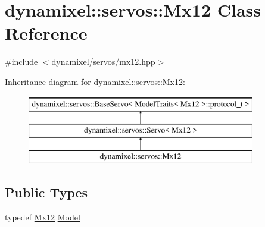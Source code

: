 \hypertarget{classdynamixel_1_1servos_1_1_mx12}{}\section{dynamixel\+:\+:servos\+:\+:Mx12 Class Reference}
\label{classdynamixel_1_1servos_1_1_mx12}


{\ttfamily \#include $<$dynamixel/servos/mx12.\+hpp$>$}

Inheritance diagram for dynamixel\+:\+:servos\+:\+:Mx12\+:\begin{figure}[H]
\begin{center}
\leavevmode
\includegraphics[height=3.000000cm]{classdynamixel_1_1servos_1_1_mx12}
\end{center}
\end{figure}
\subsection*{Public Types}
\begin{DoxyCompactItemize}
\item 
typedef \hyperlink{classdynamixel_1_1servos_1_1_mx12}{Mx12} \hyperlink{classdynamixel_1_1servos_1_1_mx12_a9b2d42b5b11f156e97e0cb7b757dc7af}{Model}
\end{DoxyCompactItemize}
